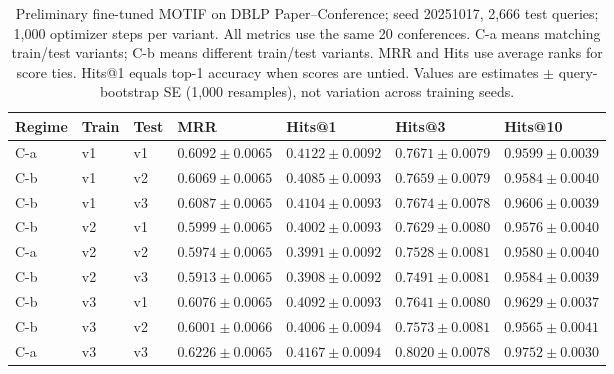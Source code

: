 \begin{table}[htbp]
\centering
\small
\renewcommand{\arraystretch}{1.15}
\setlength{\tabcolsep}{5pt}
\begin{adjustbox}{max width=\linewidth}
\begin{tabular}{|l|l|l|l|l|l|l|}
\hline
\textbf{Regime} & \textbf{Train} & \textbf{Test} & \textbf{MRR} & \textbf{Hits@1} & \textbf{Hits@3} & \textbf{Hits@10} \\
\hline
C-a & v1 & v1 & $0.6092 \pm 0.0065$ & $0.4122 \pm 0.0092$ & $0.7671 \pm 0.0079$ & $0.9599 \pm 0.0039$ \\
\hline
C-b & v1 & v2 & $0.6069 \pm 0.0065$ & $0.4085 \pm 0.0093$ & $0.7659 \pm 0.0079$ & $0.9584 \pm 0.0040$ \\
\hline
C-b & v1 & v3 & $0.6087 \pm 0.0065$ & $0.4104 \pm 0.0093$ & $0.7674 \pm 0.0078$ & $0.9606 \pm 0.0039$ \\
\hline
C-b & v2 & v1 & $0.5999 \pm 0.0065$ & $0.4002 \pm 0.0093$ & $0.7629 \pm 0.0080$ & $0.9576 \pm 0.0040$ \\
\hline
C-a & v2 & v2 & $0.5974 \pm 0.0065$ & $0.3991 \pm 0.0092$ & $0.7528 \pm 0.0081$ & $0.9580 \pm 0.0040$ \\
\hline
C-b & v2 & v3 & $0.5913 \pm 0.0065$ & $0.3908 \pm 0.0092$ & $0.7491 \pm 0.0081$ & $0.9584 \pm 0.0039$ \\
\hline
C-b & v3 & v1 & $0.6076 \pm 0.0065$ & $0.4092 \pm 0.0093$ & $0.7641 \pm 0.0080$ & $0.9629 \pm 0.0037$ \\
\hline
C-b & v3 & v2 & $0.6001 \pm 0.0066$ & $0.4006 \pm 0.0094$ & $0.7573 \pm 0.0081$ & $0.9565 \pm 0.0041$ \\
\hline
C-a & v3 & v3 & $0.6226 \pm 0.0065$ & $0.4167 \pm 0.0094$ & $0.8020 \pm 0.0078$ & $0.9752 \pm 0.0030$ \\
\hline
\end{tabular}
\end{adjustbox}
\caption{Preliminary fine-tuned MOTIF on DBLP Paper--Conference; seed 20251017, 2,666 test queries; 1,000 optimizer steps per variant. All metrics use the same 20 conferences. C-a means matching train/test variants; C-b means different train/test variants. MRR and Hits use average ranks for score ties. Hits@1 equals top-1 accuracy when scores are untied. Values are estimates $\pm$ query-bootstrap SE (1,000 resamples), not variation across training seeds.}
\label{tab:motif-dblp-matrix-link-prediction}
\end{table}
